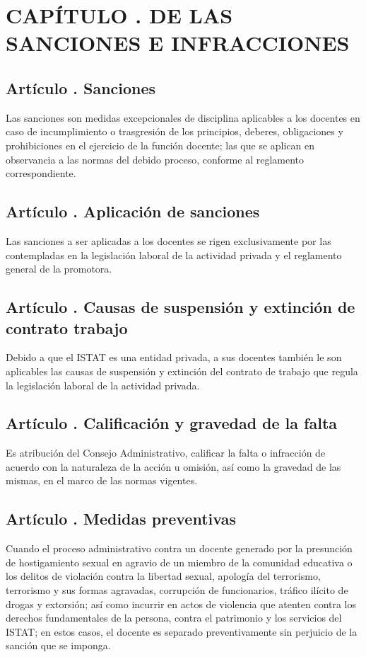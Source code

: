 \section{CAPÍTULO . DE LAS SANCIONES E INFRACCIONES}
\setcounter{re}{1}


\subsection{Artículo . Sanciones}
\addtocounter{ns}{1}
Las sanciones son medidas excepcionales de disciplina aplicables a los docentes en caso de incumplimiento o trasgresión de los principios, deberes, obligaciones y prohibiciones en el ejercicio de la función docente; las que se aplican en observancia a las normas del debido proceso, conforme al reglamento correspondiente. 
\subsection{Artículo . Aplicación de sanciones}
\addtocounter{ns}{1}
Las sanciones a ser aplicadas a los docentes se rigen exclusivamente por las contempladas en la legislación laboral de la actividad privada y el reglamento general de la promotora.
\subsection{Artículo . Causas de suspensión y extinción de contrato trabajo}
\addtocounter{ns}{1}
Debido a que el ISTAT es una entidad privada, a sus docentes también le son aplicables las causas de suspensión y extinción del contrato de trabajo que regula la legislación laboral de la actividad privada. 
\subsection{Artículo . Calificación y gravedad de la falta}
\addtocounter{ns}{1}
Es atribución del Consejo Administrativo, calificar la falta o infracción de acuerdo con la naturaleza de la acción u omisión, así como la gravedad de las mismas, en el marco de las normas vigentes. 
\subsection{Artículo . Medidas preventivas}
\addtocounter{ns}{1}
Cuando el proceso administrativo contra un docente generado por la presunción de hostigamiento sexual en agravio de un miembro de la comunidad educativa o los delitos de violación contra la libertad sexual, apología del terrorismo, terrorismo y sus formas agravadas, corrupción de funcionarios, tráfico ilícito de drogas y extorsión; así como incurrir en actos de violencia que atenten contra los derechos fundamentales de la persona, contra el patrimonio y los servicios del ISTAT; en estos casos, el docente es separado preventivamente sin perjuicio de la sanción que se imponga.
